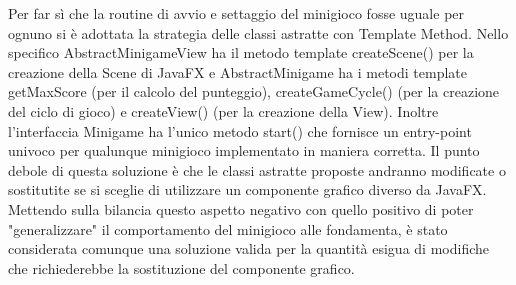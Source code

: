 \documentclass[a4paper,12pt]{report}
\begin{document}
	Per far sì che la routine di avvio e settaggio del minigioco fosse uguale per ognuno si è adottata la strategia delle classi astratte con Template Method.
	Nello specifico AbstractMinigameView ha il metodo template createScene() per la creazione della Scene di JavaFX e AbstractMinigame ha i metodi template getMaxScore (per il calcolo del punteggio), createGameCycle() (per la creazione del ciclo di gioco) e createView() (per la creazione della View).\newline
	Inoltre l'interfaccia Minigame ha l'unico metodo start() che fornisce un entry-point univoco per qualunque minigioco implementato in maniera corretta.\newline
	\newline
	Il punto debole di questa soluzione è che le classi astratte proposte andranno modificate o sostitutite se si sceglie di utilizzare un componente grafico diverso da JavaFX. Mettendo sulla bilancia questo aspetto negativo con quello positivo di poter "generalizzare" il comportamento del minigioco alle fondamenta, è stato considerata comunque una soluzione valida per la quantità esigua di modifiche che richiederebbe la sostituzione del componente grafico.
\end{document}
